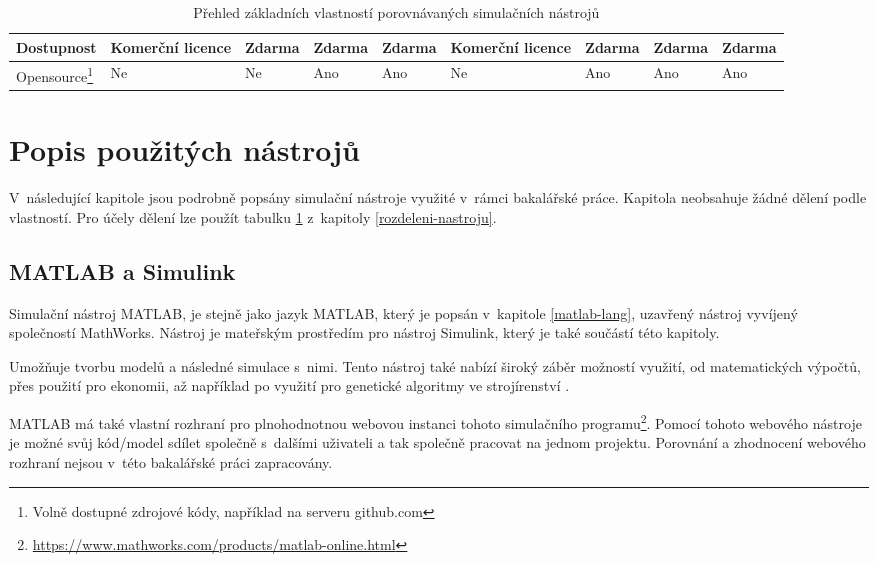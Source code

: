 \begin{savenotes}
\begin{table}[]
{\begin{tabular}{|l|l|l|l|l|l|l|l|l|}
Dostupnost                                                                                          & Komerční licence & Zdarma     & Zdarma & Zdarma  & Komerční licence & Zdarma                                                   & Zdarma    & Zdarma         \\ \hline
Opensource\footnote{Volně dostupné zdrojové kódy, například na serveru github.com} & Ne                                                                                                              & Ne         & Ano    & Ano     & Ne               & Ano                                                      & Ano        & Ano            \\ \hline
\end{tabular}%
}
\caption{Přehled základních vlastností porovnávaných simulačních nástrojů}
\label{tab:rozdeleni-nastroju}
\end{table}
\end{savenotes}



\section{Popis použitých nástrojů}
\label{popis-nastroju}
V~následující kapitole jsou podrobně popsány simulační nástroje využité v~rámci bakalářské práce. Kapitola neobsahuje žádné dělení podle vlastností. Pro účely dělení lze použít tabulku \ref{tab:rozdeleni-nastroju} z~kapitoly \ref{rozdeleni-nastroju}. 
\subsection{MATLAB a Simulink}
\label{matlab-desc}

Simulační nástroj MATLAB, je stejně jako jazyk MATLAB, který je popsán v~kapitole \ref{matlab-lang}, uzavřený nástroj vyvíjený společností MathWorks. Nástroj je mateřským prostředím pro nástroj Simulink, který je také součástí této kapitoly. 

Umožňuje tvorbu modelů a následné simulace s~nimi. Tento nástroj také nabízí široký záběr možností využití, od matematických výpočtů, přes použití pro ekonomii, až například po využití pro genetické algoritmy ve strojírenství \cite{Zapletal2016}.

MATLAB má také vlastní rozhraní pro plnohodnotnou webovou instanci tohoto simulačního programu\footnote{\url{https://www.mathworks.com/products/matlab-online.html}}. Pomocí tohoto webového nástroje je možné svůj kód/model sdílet společně s~dalšími uživateli a tak společně pracovat na jednom projektu. Porovnání a zhodnocení webového rozhraní nejsou v~této bakalářské práci zapracovány.

